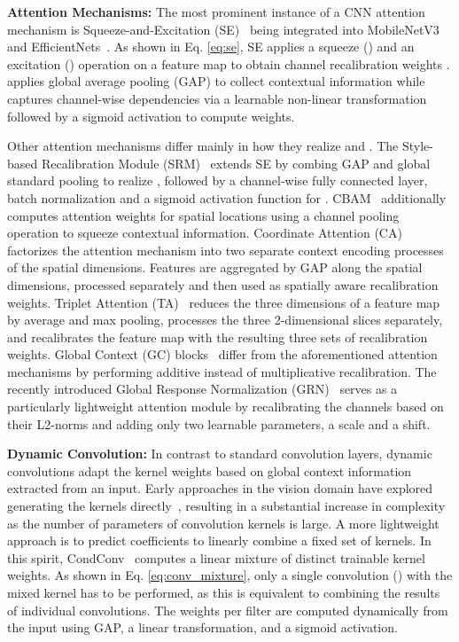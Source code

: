 \documentclass[lettersize,journal]{IEEEtran}
\begin{document}
\textbf{Attention Mechanisms:} The most prominent instance of a CNN attention mechanism is Squeeze-and-Excitation (SE)~\cite{Hu18Squeeze} being integrated into MobileNetV3~\cite{Howard19MobileNetV3} and EfficientNets~\cite{Tan19EfficientNet,Tan21EfficientNetV2}. As shown in Eq. \ref{eq:se}, SE applies a squeeze () and an excitation () operation on a feature map to obtain channel recalibration weights .  applies global average pooling (GAP) to collect contextual information while  captures channel-wise dependencies via a learnable non-linear transformation followed by a sigmoid activation to compute weights.



Other attention mechanisms differ mainly in how they realize  and . The Style-based Recalibration Module (SRM)~\cite{lee2019srm} extends SE by combing GAP and global standard pooling to realize , followed by a channel-wise fully connected layer, batch normalization and a sigmoid activation function for . CBAM~\cite{woo2018cbam} additionally computes attention weights for spatial locations using a channel pooling operation to squeeze contextual information. Coordinate Attention (CA)~\cite{hou2021coordinate} factorizes the attention mechanism into two separate context encoding processes of the spatial dimensions. Features are aggregated by GAP along the spatial dimensions, processed separately and then used as spatially aware recalibration weights. Triplet Attention (TA)~\cite{misra2021triplet} reduces the three dimensions of a feature map by average and max pooling, processes the three 2-dimensional slices separately, and recalibrates the feature map with the resulting three sets of recalibration weights. Global Context (GC) blocks~\cite{cao2019gcnet} differ from the aforementioned attention mechanisms by performing additive instead of multiplicative recalibration. The recently introduced Global Response Normalization (GRN)~\cite{woo2023convnextv2} serves as a particularly lightweight attention module by recalibrating the channels based on their L2-norms and adding only two learnable parameters, a scale and a shift.  

\textbf{Dynamic Convolution:} In contrast to standard convolution layers, dynamic convolutions adapt the kernel weights based on global context information extracted from an input. Early approaches in the vision domain have explored generating the kernels directly~\cite{jia2016dynamic, klein2015dynamic}, resulting in a substantial increase in complexity as the number of parameters of convolution kernels is large. A more lightweight approach is to predict coefficients to linearly combine a fixed set of kernels. In this spirit, CondConv~\cite{yang2019condconv} computes a linear mixture of  distinct trainable kernel weights. As shown in Eq. \ref{eq:conv_mixture}, only a single convolution () with the mixed kernel has to be performed, as this is equivalent to combining the results of  individual convolutions. The weights  per filter are computed dynamically from the input using GAP, a linear transformation, and a sigmoid activation.
\end{document}
